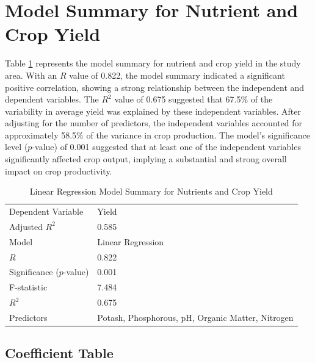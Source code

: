 \section{Model Summary for Nutrient and Crop Yield}

Table \ref{tab:model_summary} represents the model summary for nutrient and crop yield in the study area. With an $R$ value of 0.822, the model summary indicated a significant positive correlation, showing a strong relationship between the independent and dependent variables. The $R^2$ value of 0.675 suggested that 67.5\% of the variability in average yield was explained by these independent variables. After adjusting for the number of predictors, the independent variables accounted for approximately 58.5\% of the variance in crop production. The model's significance level ($p$-value) of 0.001 suggested that at least one of the independent variables significantly affected crop output, implying a substantial and strong overall impact on crop productivity.

\begin{table}[h]
    \centering
    \caption{Linear Regression Model Summary for Nutrients and Crop Yield}
    \label{tab:model_summary}
    \begin{tabular}{ll}
        \toprule
        Dependent Variable & Yield \\
        Adjusted $R^2$ & 0.585 \\
        Model & Linear Regression \\
        $R$ & 0.822 \\
        Significance ($p$-value) & 0.001 \\
        F-statistic & 7.484 \\
        $R^2$ & 0.675 \\
        Predictors & Potash, Phosphorous, pH, Organic Matter, Nitrogen \\
        \bottomrule
    \end{tabular}
\end{table}

\subsection{Coefficient Table}

